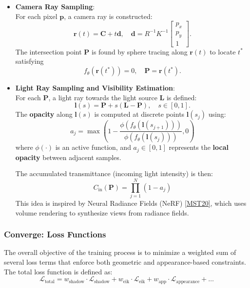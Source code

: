 \documentclass[12pt,a4paper]{article}
\theoremstyle{definition}
\begin{document}
\begin{itemize}

    \item \textbf{Camera Ray Sampling}: \\
    For each pixel $\mathbf{p}$, a camera ray is constructed:
    \[
    \mathbf{r}(t) = \mathbf{C} + t \mathbf{d}, \quad \mathbf{d} = R^{-1} K^{-1} \begin{bmatrix} p_x \\ p_y \\ 1 \end{bmatrix}.
    \]
    The intersection point $\mathbf{P}$ is found by sphere tracing along $\mathbf{r}(t)$ to locate $t^*$ satisfying
    \[
    f_\theta(\mathbf{r}(t^*)) = 0, \quad \mathbf{P} = \mathbf{r}(t^*).
    \]

    \item \textbf{Light Ray Sampling and Visibility Estimation}: \\
    For each $\mathbf{P}$, a light ray towards the light source $\mathbf{L}$ is defined:
    \[
    \mathbf{l}(s) = \mathbf{P} + s (\mathbf{L} - \mathbf{P}), \quad s \in [0, 1].
    \]
    The \textbf{opacity} along $\mathbf{l}(s)$ is computed at discrete points $\mathbf{l}(s_j)$ using:
    \[
    a_j = \max\left( 1 - \frac{ \phi(f_\theta(\mathbf{l}(s_{j+1})) ) }{ \phi(f_\theta(\mathbf{l}(s_j))) }, 0 \right)
    \]
    where $\phi(\cdot)$ is an active function, and $a_j \in [0,1]$ represents the \textbf{local opacity} between adjacent samples.

    The accumulated transmittance (incoming light intensity) is then:
    \[
    C_{\mathrm{in}}(\mathbf{P}) = \prod_{j=1}^N (1 - a_j)
    \]
    This idea is inspired by Neural Radiance Fields (NeRF) \hyperlink{[MST20]}{[MST20]}, which uses volume rendering to synthesize views from radiance fields.
\end{itemize}

\subsubsection{Converge: Loss Functions} \label{sec:loss_functions}

The overall objective of the training process is to minimize a weighted sum of several loss terms that enforce both geometric and appearance-based constraints. The total loss function is defined as:
\begin{equation}
\mathcal{L}_{\text{total}} = w_{\text{shadow}} \cdot \mathcal{L}_{\text{shadow}} + w_{\text{eik}} \cdot \mathcal{L}_{\text{eik}} + w_{\text{app}} \cdot \mathcal{L}_{\text{appearance}} + \ldots
\end{equation}
\end{document}

